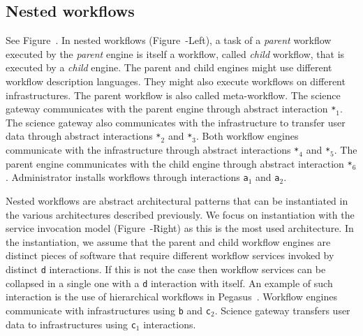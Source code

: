 \documentclass[preprint,3p,twocolumn]{elsarticle}
\begin{document}
\subsection{Nested workflows}

See Figure~. In nested workflows
(Figure~-Left), a task of a \emph{parent}
workflow executed by the \emph{parent} engine is itself a workflow,
called \emph{child} workflow, that is executed by a \emph{child}
engine. The parent and child engines might use different workflow
description languages. They might also execute workflows on different
infrastructures. The parent workflow is also called meta-workflow. The
science gateway communicates with the parent engine through abstract
interaction \texttt{*$_1$}. The science gateway also communicates with
the infrastructure to transfer user data through abstract interactions
\texttt{*$_2$} and \texttt{*$_3$}. Both workflow engines communicate
with the infrastructure through abstract interactions \texttt{*$_4$}
and \texttt{*$_5$}. The parent engine communicates with the child
engine through abstract interaction \texttt{*$_6$}. Administrator
installs workflows through interactions \texttt{a$_1$} and
\texttt{a$_2$}.

Nested workflows are abstract architectural patterns that can be
instantiated in the various architectures described previously. We
focus on instantiation with the service invocation model
(Figure~-Right) as this is the most used
architecture. In the instantiation, we assume that the parent and
child workflow engines are distinct pieces of software that require
different workflow services invoked by distinct \texttt{d}
interactions. If this is not the case then workflow services can be
collapsed in a single one with a \texttt{d} interaction with
itself. An example of such interaction is the use of hierarchical
workflows in Pegasus~\cite{Deelman201517}.
Workflow engines communicate with infrastructures using
\texttt{b} and \texttt{c$_2$}. Science gateway transfers user data to
infrastructures using \texttt{c$_1$} interactions.
\end{document}
